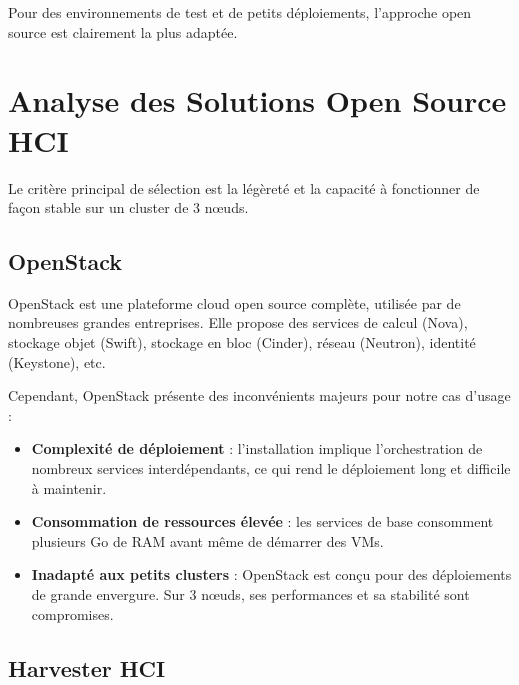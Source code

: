 \par Pour des environnements de test et de petits déploiements, l'approche open source est clairement la plus adaptée.\\

\section{Analyse des Solutions Open Source HCI}

\par Le critère principal de sélection est la légèreté et la capacité à fonctionner de façon stable sur un cluster de 3 n\oe{}uds.\\

\subsection{OpenStack}

\par OpenStack est une plateforme cloud open source complète, utilisée par de nombreuses grandes entreprises. Elle propose des services de calcul (Nova), stockage objet (Swift), stockage en bloc (Cinder), réseau (Neutron), identité (Keystone), etc.~\cite{ref3}\\

\par Cependant, OpenStack présente des inconvénients majeurs pour notre cas d'usage :\\

\begin{itemize}

    \item \textbf{Complexité de déploiement} : l'installation implique l'orchestration de nombreux services interdépendants, ce qui rend le déploiement long et difficile à maintenir.

    \item \textbf{Consommation de ressources élevée} : les services de base consomment plusieurs Go de RAM avant même de démarrer des VMs.

    \item \textbf{Inadapté aux petits clusters} : OpenStack est conçu pour des déploiements de grande envergure. Sur 3 n\oe{}uds, ses performances et sa stabilité sont compromises.

\end{itemize}

\subsection{Harvester HCI}

